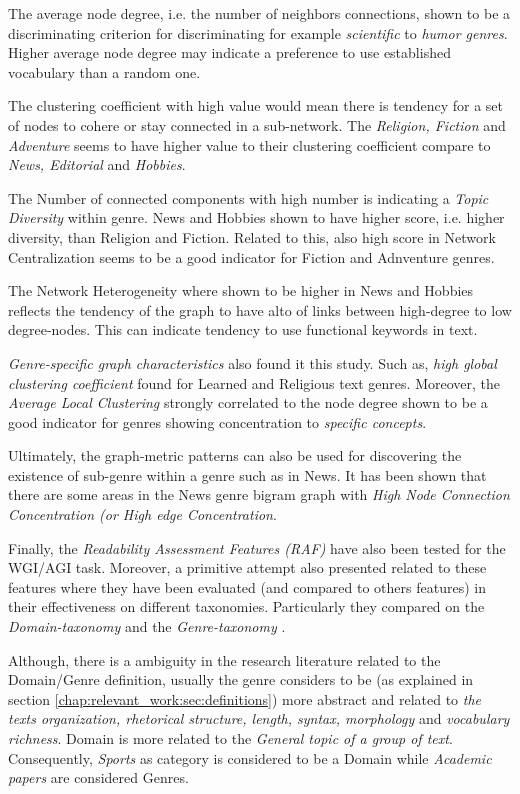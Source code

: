 The average node degree, i.e. the number of neighbors connections, shown  to be a discriminating criterion for discriminating for example \textit{scientific} to \textit{humor genres}. Higher average node degree may indicate a preference to use established vocabulary than a random one.

The clustering coefficient with high value would mean there is tendency for a set of nodes to cohere or stay connected in a sub-network. The \textit{Religion, Fiction} and \textit{Adventure} seems to have higher value to their clustering coefficient compare to \textit{News, Editorial} and \textit{Hobbies}. 

The Number of connected components with high number is indicating a \textit{Topic Diversity} within genre. News and Hobbies shown to have higher score, i.e. higher diversity, than Religion and Fiction. Related to this, also high score in Network Centralization seems to be a good indicator for Fiction and Adnventure genres.

The Network Heterogeneity where shown to be higher in News and Hobbies reflects the tendency of the graph to have alto of links between high-degree to low degree-nodes. This can indicate tendency to use functional keywords in text.

\textit{Genre-specific graph characteristics} also found it this study. Such as, \textit{high global clustering coefficient} found for Learned and Religious text genres. Moreover, the \textit{Average Local Clustering} strongly correlated to the node degree shown to be a good indicator for genres showing concentration to \textit{specific concepts}.

Ultimately, the graph-metric patterns can also be used for discovering the existence of sub-genre within a genre such as in News. It has been shown that there are some areas in the News genre bigram graph with \textit{High Node Connection Concentration (or High edge Concentration}.  

 Finally, the \textit{Readability Assessment Features (RAF)} have also been tested for the WGI/AGI task. Moreover, a primitive attempt also presented related to these features where they have been evaluated (and compared to others features) in their effectiveness on different taxonomies. Particularly they compared on the \textit{Domain-taxonomy} and the \textit{Genre-taxonomy} \parencite{falkenjack2016exploratory}.

Although, there is a ambiguity in the research literature related to the Domain/Genre definition, usually the genre considers to be (as explained in section \ref{chap:relevant_work:sec:definitions}) more abstract and related to \textit{the texts organization, rhetorical structure, length, syntax, morphology} and \textit{vocabulary richness}. Domain is more related to the \textit{General topic of a group of text}. Consequently, \textit{Sports} as category is considered to be a Domain while \textit{Academic papers} are considered Genres.

